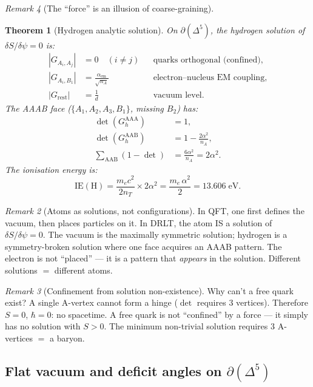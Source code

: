 \documentclass[12pt]{article}
\newtheorem{theorem}{Theorem}[section]
\theoremstyle{remark}
\newtheorem{remark}[theorem]{Remark}
\theoremstyle{definition}
\begin{document}
\begin{remark}[The ``force'' is an illusion of coarse-graining]
\begin{theorem}[Hydrogen analytic solution]
\label{thm:hydrogen_solution}
On $\partial(\Delta^5)$, the hydrogen solution of $\delta S/\delta\psi = 0$ is:
\begin{align}
|G_{A_i, A_j}| &= 0 \quad (i \ne j) &&\text{quarks orthogonal (confined)}, \\
|G_{A_i, B_1}| &= \frac{\alpha_{\mathrm{em}}}{\sqrt{n_A}} &&\text{electron--nucleus EM coupling}, \\
|G_{\mathrm{rest}}| &= \frac{1}{d} &&\text{vacuum level}.
\end{align}
The AAAB face ($\{A_1, A_2, A_3, B_1\}$, missing $B_2$) has:
\begin{align}
\det(G_h^{\mathrm{AAA}}) &= 1, \\
\det(G_h^{\mathrm{AAB}}) &= 1 - \frac{2\alpha^2}{n_A}, \\
\sum_{\mathrm{AAB}} (1 - \det) &= \frac{6\alpha^2}{n_A} = 2\alpha^2.
\end{align}
The ionisation energy is:
\begin{equation}
\boxed{\mathrm{IE}(\mathrm{H}) = \frac{m_e c^2}{2 n_T} \times 2\alpha^2 = \frac{m_e\,\alpha^2}{2} = 13.606\;\mathrm{eV}.}
\end{equation}
\end{theorem}

\begin{remark}[Atoms as solutions, not configurations]
In QFT, one first defines the vacuum, then places particles on it.  In DRLT, the atom IS a solution of $\delta S/\delta\psi = 0$.  The vacuum is the maximally symmetric solution; hydrogen is a symmetry-broken solution where one face acquires an AAAB pattern.  The electron is not ``placed'' --- it is a pattern that \emph{appears} in the solution.  Different solutions $=$ different atoms.
\end{remark}

\begin{remark}[Confinement from solution non-existence]
Why can't a free quark exist?  A single A-vertex cannot form a hinge ($\det$ requires 3 vertices).  Therefore $S = 0$, $\hbar = 0$: no spacetime.  A free quark is not ``confined'' by a force --- it simply has no solution with $S > 0$.  The minimum non-trivial solution requires 3 A-vertices $=$ a baryon.
\end{remark}

\subsection{Flat vacuum and deficit angles on $\partial(\Delta^5)$}
\label{sec:flat_vacuum}


\end{remark}
\end{document}
